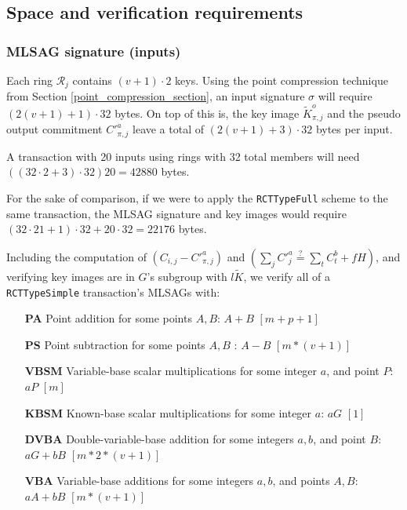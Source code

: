 \subsection{Space and verification requirements}

\subsubsection*{MLSAG signature (inputs)}

Each ring \(\mathcal{R}_j\) contains \((v+1) \cdot 2\) keys. Using the point compression technique from Section \ref{point_compression_section}, an input signature $\sigma$ will require \( (2(v+1) + 1) \cdot 32  \) bytes. On top of this is, the key image $\tilde{K}^o_{\pi,j}$ and the pseudo output commitment $C'^a_{\pi,j}$ leave a total of $(2(v+1)+3) \cdot 32$ bytes per input.

A transaction with 20 inputs using rings with 32 total members will need \(((32 \cdot 2 + 3) \cdot 32) 20 = 42880 \) bytes.

For the sake of comparison, if we were to apply the {\tt RCTTypeFull} scheme to the same transaction, the MLSAG signature and key images would require \(( 32 \cdot 21 + 1) \cdot 32 + 20 \cdot 32 = 22176\) bytes.

Including the computation of \( (C_{i, j} - C'^a_{\pi, j}) \) and \( (\sum_j C'^a_{j} \stackrel{?}{=} \sum_t C^b_{t} + f H)\), and verifying key images are in $G$'s subgroup with $l \tilde{K}$, we verify all of a {\tt RCTTypeSimple} transaction's MLSAGs with:

\begin{itemize}
    \setlength\itemsep{\listspace}
    \item [\textbf{PA}] Point addition for some points $A, B$: $A + B$ \quad \([m + p + 1]\)%
    \item [\textbf{PS}] Point subtraction for some points $A, B$ : $A - B$ \quad \([m*(v+1)]\) %
    \item [\textbf{VBSM}] Variable-base scalar multiplications for some integer $a$, and point $P$: $a P$ \quad \([m]\)
    \item [\textbf{KBSM}] Known-base scalar multiplications for some integer $a$: $a G$ \quad \([1]\)
    \item [\textbf{DVBA}] Double-variable-base addition for some integers $a, b$, and point $B$: $a G + b B$ \quad \([m*2*(v+1)]\)
    \item [\textbf{VBA}] Variable-base additions for some integers $a, b$, and points $A, B$: $a A + b B$ \quad \([m*(v+1)]\)
\end{itemize}

